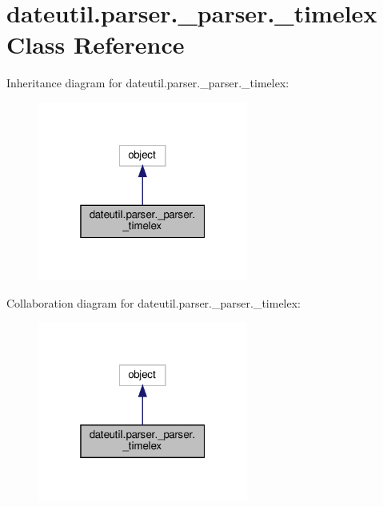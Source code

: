 \hypertarget{classdateutil_1_1parser_1_1__parser_1_1__timelex}{}\section{dateutil.\+parser.\+\_\+parser.\+\_\+timelex Class Reference}
\label{classdateutil_1_1parser_1_1__parser_1_1__timelex}


Inheritance diagram for dateutil.\+parser.\+\_\+parser.\+\_\+timelex\+:
\nopagebreak
\begin{figure}[H]
\begin{center}
\leavevmode
\includegraphics[width=196pt]{classdateutil_1_1parser_1_1__parser_1_1__timelex__inherit__graph}
\end{center}
\end{figure}


Collaboration diagram for dateutil.\+parser.\+\_\+parser.\+\_\+timelex\+:
\nopagebreak
\begin{figure}[H]
\begin{center}
\leavevmode
\includegraphics[width=196pt]{classdateutil_1_1parser_1_1__parser_1_1__timelex__coll__graph}
\end{center}
\end{figure}
